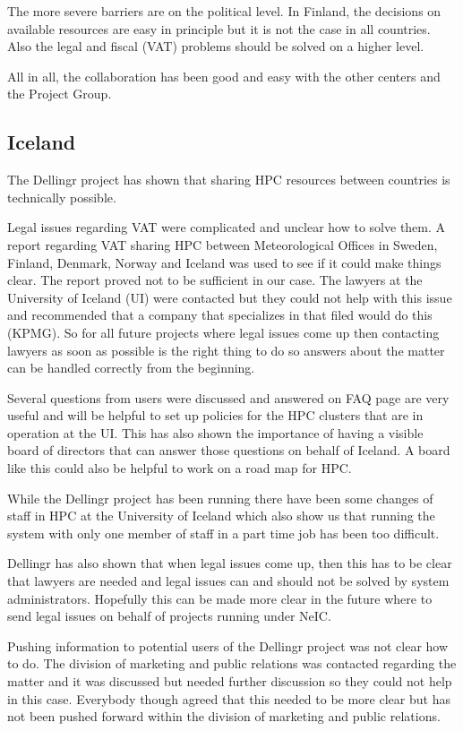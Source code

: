\documentclass{article}
\newcommand{\dell}{Dellingr\xspace}
\begin{document}
The more severe barriers are on the political level. 
In Finland, the decisions on available resources are easy in principle but it is not the case in all countries. 
Also the legal and fiscal (VAT) problems should be solved on a higher level.

All in all, the collaboration has been good and easy with the other centers and the Project Group. 

\subsection{Iceland}

The \dell project has shown that sharing HPC resources between countries is technically possible.

Legal issues regarding VAT were complicated and unclear how to solve them. 
A report regarding VAT sharing HPC between Meteorological Offices in Sweden, Finland, Denmark, Norway and Iceland was used to see if it could make things clear. 
The report proved not to be sufficient in our case. 
The lawyers at the University of Iceland (UI) were contacted but they could not help with this issue and recommended that a company that specializes in that filed would do this (KPMG). 
So for all future projects where legal issues come up then contacting lawyers as soon as possible is the right thing to do so answers about the matter can be handled correctly from the beginning.

Several questions from users were discussed and answered on FAQ page are very useful and will be helpful to set up policies for the HPC clusters that are in operation at the UI. 
This has also shown the importance of having a visible board of directors that can answer those questions on behalf of Iceland. 
A board like this could also be helpful to work on a road map for HPC.

While the \dell project has been running there have been some changes of staff in HPC at the University of Iceland which also show us that running the system with only one member of staff in a part time job has been too difficult.

\dell has also shown that when legal issues come up, then this has to be clear that lawyers are needed and legal issues can and should not be solved by system administrators. 
Hopefully this can be made more clear in the future where to send legal issues on behalf of projects running under NeIC.

Pushing information to potential users of the \dell project was not clear how to do. 
The division of marketing and public relations was contacted regarding the matter and it was discussed but needed further discussion so they could not help in this case. 
Everybody though agreed that this needed to be more clear but has not been pushed forward within the division of marketing and public relations. 
\end{document}
